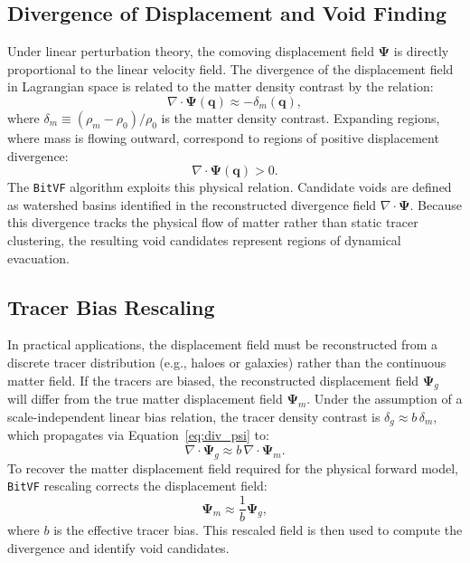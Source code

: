 \documentclass[12pt]{report}
\begin{document}
\subsection{Divergence of Displacement and Void Finding}

Under linear perturbation theory, the comoving displacement field $\boldsymbol{\Psi}$ is directly proportional to the linear velocity field. The divergence of the displacement field in Lagrangian space is related to the matter density contrast by the relation:
\begin{equation}
    \nabla \cdot \boldsymbol{\Psi}(\mathbf{q}) \approx -\delta_m(\mathbf{q})
    \label{eq:div_psi},
\end{equation}
where $\delta_m \equiv (\rho_m - \rho_0)/\rho_0$ is the matter density contrast. Expanding regions, where mass is flowing outward, correspond to regions of positive displacement divergence:
\begin{equation}
    \nabla \cdot \boldsymbol{\Psi}(\mathbf{q}) > 0
    \label{eq:div_condition}.
\end{equation}
The \texttt{BitVF} algorithm exploits this physical relation. Candidate voids are defined as watershed basins identified in the reconstructed divergence field $\nabla \cdot \boldsymbol{\Psi}$. Because this divergence tracks the physical flow of matter rather than static tracer clustering, the resulting void candidates represent regions of dynamical evacuation.

\subsection{Tracer Bias Rescaling}

In practical applications, the displacement field must be reconstructed from a discrete tracer distribution (e.g., haloes or galaxies) rather than the continuous matter field. If the tracers are biased, the reconstructed displacement field $\boldsymbol{\Psi}_g$ will differ from the true matter displacement field $\boldsymbol{\Psi}_m$. Under the assumption of a scale-independent linear bias relation, the tracer density contrast is $\delta_g \approx b\,\delta_m$, which propagates via Equation~\ref{eq:div_psi} to:
\begin{equation}
    \nabla \cdot \boldsymbol{\Psi}_g \approx b\,\nabla \cdot \boldsymbol{\Psi}_m
    \label{eq:bias_relation}.
\end{equation}
To recover the matter displacement field required for the physical forward model, \texttt{BitVF} rescaling corrects the displacement field:
\begin{equation}
    \boldsymbol{\Psi}_m \approx \frac{1}{b} \boldsymbol{\Psi}_g
    \label{eq:bias_correction_ot},
\end{equation}
where $b$ is the effective tracer bias. This rescaled field is then used to compute the divergence and identify void candidates.
\end{document}
